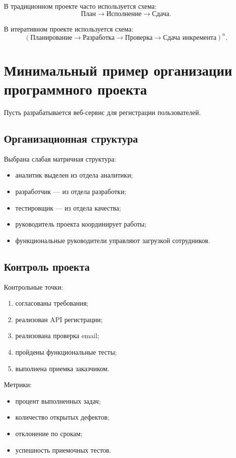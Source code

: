 \documentclass[12pt,a4paper]{article}
\begin{document}
В традиционном проекте часто используется схема:
\[
\text{План} \rightarrow \text{Исполнение} \rightarrow \text{Сдача}.
\]

В итеративном проекте используется схема:
\[
\left(
\text{Планирование}
\rightarrow
\text{Разработка}
\rightarrow
\text{Проверка}
\rightarrow
\text{Сдача инкремента}
\right)^n.
\]

\section{Минимальный пример организации программного проекта}

Пусть разрабатывается веб-сервис для регистрации пользователей.

\subsection*{Организационная структура}

Выбрана слабая матричная структура:
\begin{itemize}
    \item аналитик выделен из отдела аналитики;
    \item разработчик --- из отдела разработки;
    \item тестировщик --- из отдела качества;
    \item руководитель проекта координирует работы;
    \item функциональные руководители управляют загрузкой сотрудников.
\end{itemize}

\subsection*{Контроль проекта}

Контрольные точки:
\begin{enumerate}
    \item согласованы требования;
    \item реализован API регистрации;
    \item реализована проверка email;
    \item пройдены функциональные тесты;
    \item выполнена приемка заказчиком.
\end{enumerate}

Метрики:
\begin{itemize}
    \item процент выполненных задач;
    \item количество открытых дефектов;
    \item отклонение по срокам;
    \item успешность приемочных тестов.
\end{itemize}
\end{document}
